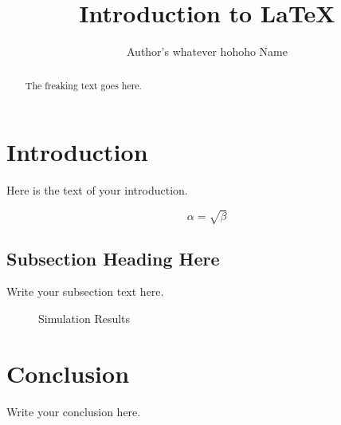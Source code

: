 \documentclass{article}
\begin{document}
\title{Introduction to \LaTeX{}}
\author{Author's whatever hohoho Name}

\maketitle

\begin{abstract}
The freaking text goes here.
\end{abstract}

\section{Introduction}
Here is the text of your introduction.

\begin{equation}
    \label{simple_equation}
    \alpha = \sqrt{ \beta }
\end{equation}

\subsection{Subsection Heading Here}
Write your subsection text here.

\begin{figure}
    \centering
    \caption{Simulation Results}
    \label{simulationfigure}
\end{figure}

\section{Conclusion}
Write your conclusion here.
\end{document}
